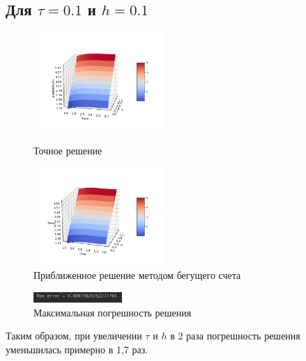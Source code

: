 \documentclass[12pt,a4paper]{scrartcl}
\begin{document}
	\subsection{Для $\tau = 0.1$ и $h = 0.1$}
	\begin{figure}[h]
		\begin{multicols}{2}
			\hfill
			\includegraphics[width=50mm]{mainFunc10-10.png}
			\hfill
			\caption{Точное решение}
			\hfill
			\includegraphics[width=50mm]{result10-10.png}
			\hfill
			\caption{Приближенное решение методом бегущего счета}
		\end{multicols}
	\end{figure}
	\begin{figure}[h]
		\centering
		\includegraphics[width=0.3\textwidth]{MaxError10-10.png}
		\caption{Максимальная погрешность решения}
	\end{figure}

    \newpage
	Таким образом, при увеличении $\tau$ и $h$ в 2 раза погрешность решения уменьшилась примерно в 1,7 раз.
	
\end{document}
